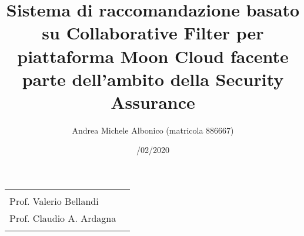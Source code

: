 \documentclass[10pt,a4paper]{article}
\begin{document}
\title{\textbf{Sistema di raccomandazione basato su Collaborative Filter per piattaforma Moon Cloud
facente parte dell'ambito della Security Assurance}}
\author{Andrea Michele Albonico (matricola 886667)}
\date{/02/2020}

\maketitle

\vspace{0.5 cm}

\begin{minipage}{\linewidth}
    \begin{tabular}{l r}
        \begin{minipage}[t]{.4\linewidth}
            \begin{flushleft}
                {
                    RELATORE\\[.15cm]
                    Prof. Valerio Bellandi
                }
            \end{flushleft}
        \end{minipage}
        &
        \begin{minipage}[t]{.53\linewidth}
            \begin{flushright}
                {
                    CORRELATORE\\[.15cm]
                    Prof. Claudio A. Ardagna\\[.1cm]
                }
            \end{flushright}
        \end{minipage}
    \end{tabular}
\end{minipage}

\vspace{2 cm}
\end{document}
